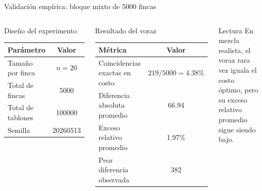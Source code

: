 \documentclass[aspectratio=169]{beamer}
\begin{document}
\begin{frame}{Validaci\'on emp\'irica: bloque mixto de 5000 fincas}
  \begin{columns}[T,onlytextwidth]
    \small
    \begin{block}{Dise\~no del experimento}
      \begin{tabular}{@{}lc@{}}
        \toprule
        Par\'ametro & Valor \\
        \midrule
        Tama\~no por finca & \(n=20\) \\
        Total de fincas & 5000 \\
        Total de tablones & 100000 \\
        Semilla & 20260513 \\
        \bottomrule
      \end{tabular}
    \end{block}

    \small
    \begin{block}{Resultado del voraz}
      \begin{tabular}{@{}lc@{}}
        \toprule
        M\'etrica & Valor \\
        \midrule
        Coincidencias exactas en costo & \(219/5000=4.38\%\) \\
        Diferencia absoluta promedio & 66.94 \\
        Exceso relativo promedio & 1.97\% \\
        Peor diferencia observada & 382 \\
        \bottomrule
      \end{tabular}
    \end{block}

    \begin{alertblock}{Lectura}
      En mezcla realista, el voraz rara vez iguala el costo \'optimo, pero su exceso relativo promedio sigue siendo bajo.
    \end{alertblock}
  \end{columns}
\end{frame}
\end{document}
